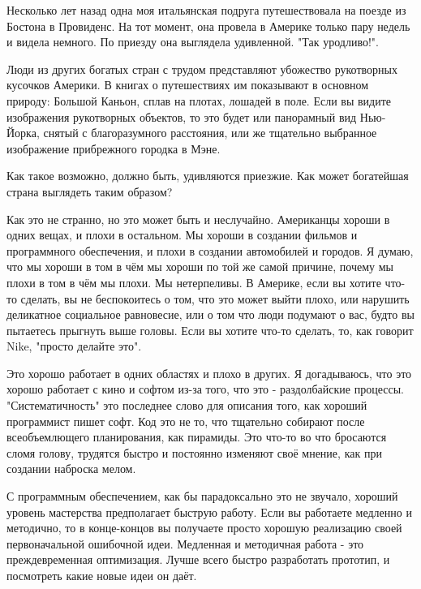 \documentclass[ebook,12pt,oneside,openany]{memoir}
\begin{document}
\maketitle

Несколько лет назад одна моя итальянская подруга путешествовала на
поезде из Бостона в Провиденс. На тот момент, она провела в Америке
только пару недель и видела немного. По приезду она выглядела
удивленной. "Так уродливо!".

Люди из других богатых стран с трудом представляют убожество
рукотворных кусочков Америки. В книгах о путешествиях им показывают в
основном природу: Большой Каньон, сплав на плотах, лошадей в поле.
Если вы видите изображения рукотворных объектов, то это будет или
панорамный вид Нью-Йорка, снятый с благоразумного расстояния, или же
тщательно выбранное изображение прибрежного городка в Мэне.

Как такое возможно, должно быть, удивляются приезжие. Как может
богатейшая страна выглядеть таким образом?

Как это не странно, но это может быть и неслучайно. Американцы хороши
в одних вещах, и плохи в остальном. Мы хороши в создании фильмов и
программного обеспечения, и плохи в создании автомобилей и городов. Я
думаю, что мы хороши в том в чём мы хороши по той же самой причине,
почему мы плохи в том в чём мы плохи. Мы нетерпеливы. В Америке, если
вы хотите что-то сделать, вы не беспокоитесь о том, что это может
выйти плохо, или нарушить деликатное социальное равновесие, или о том
что люди подумают о вас, будто вы пытаетесь прыгнуть выше головы. Если
вы хотите что-то сделать, то, как говорит Nike, "просто делайте это".

Это хорошо работает в одних областях и плохо в других. Я догадываюсь,
что это хорошо работает с кино и софтом из-за того, что это -
раздолбайские процессы. "Систематичность" это последнее слово для
описания того, как хороший программист пишет софт. Код это не то, что
тщательно собирают после всеобъемлющего планирования, как пирамиды.
Это что-то во что бросаются сломя голову, трудятся быстро и постоянно
изменяют своё мнение, как при создании наброска мелом.

С программным обеспечением, как бы парадоксально это не звучало,
хороший уровень мастерства предполагает быструю работу. Если вы
работаете медленно и методично, то в конце-концов вы получаете просто
хорошую реализацию своей первоначальной ошибочной идеи. Медленная и
методичная работа - это преждевременная оптимизация. Лучше всего
быстро разработать прототип, и посмотреть какие новые идеи он даёт.
\end{document}
